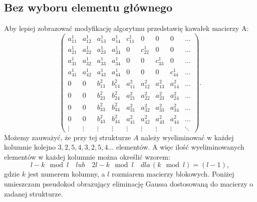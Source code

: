 \documentclass{article}
\begin{document}
\subsection{Bez wyboru elementu głównego}
Aby lepiej zobrazować modyfikację algorytmu przedstawię kawałek macierzy A:
$$
\begin{pmatrix}
    a_{11}^1 & a_{12}^1 & a_{13}^1 & a_{14}^1 & c_{11}^1 & 0 & 0 & 0 & \ldots\\
    a_{21}^1 & a_{22}^1 & a_{23}^1 & a_{24}^1 & 0 & c_{22}^1 & 0 & 0 & \ldots\\
    a_{31}^1 & a_{32}^1 & a_{33}^1 & a_{34}^1 & 0 & 0 & c_{33}^1 & 0 & \ldots\\
    a_{41}^1 & a_{42}^1 & a_{43}^1 & a_{44}^1 & 0 & 0 & 0 & c_{44}^1 & \ldots\\
    0 & 0 & b_{13}^2 & b_{14}^2 & a_{11}^2 & a_{12}^2 & a_{13}^2 & a_{14}^2 & \ldots\\
    0 & 0 & b_{23}^2 & b_{24}^2 & a_{21}^2 & a_{22}^2 & a_{23}^2 & a_{24}^2 & \ldots\\
    0 & 0 & b_{33}^2 & b_{34}^2 & a_{31}^2 & a_{32}^2 & a_{33}^2 & a_{34}^2 & \ldots\\
    0 & 0 & b_{43}^2 & b_{44}^2 & a_{41}^2 & a_{42}^2 & a_{43}^2 & a_{44}^2 & \ldots\\
    \vdots & \vdots & \vdots & \vdots & \vdots & \vdots & \vdots & \vdots & \ddots
\end{pmatrix}.
$$
Możemy zauważyć, że przy tej strukturze $A$ należy wyeliminować w każdej 
kolumnie kolejno $3,2,5,4,3,2,5,4 \ldots$ elementów. A więc ilość wyeliminowanych 
elementów w każdej kolumnie można określić wzorem:
$$
l - k \mod l \quad lub \quad 2l - k \mod l \quad dla \,(k \mod l) = (l - 1),
$$
gdzie $k$ jest numerem kolumny, a $l$ rozmiarem macierzy blokowych.
\newline
\newline
Poniżej umieszczam pseudokod obrazujący eliminację Gaussa dostosowaną 
do macierzy o zadanej strukturze.
\end{document}
